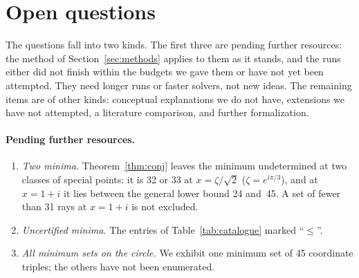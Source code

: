 \section{Open questions}\label{sec:limitations}

The questions fall into two kinds.  The first three are pending further resources: the method of
Section~\ref{sec:methods} applies to them as it stands, and the runs either did not finish
within the budgets we gave them or have not yet been attempted.  They need longer runs or faster
solvers, not new ideas.  The remaining items are of other kinds: conceptual explanations we do
not have, extensions we have not attempted, a literature comparison, and further formalization.

\paragraph{Pending further resources.}
\begin{enumerate}
\item \emph{Two minima.}  Theorem~\ref{thm:conj} leaves the minimum undetermined at two
classes of special points: it is 32 or 33 at $x=\zeta/\sqrt2$ ($\zeta=e^{i\pi/3}$),
and at $x=1+i$ it lies between the general lower bound 24 and~45.  A set of fewer than 31 rays
at $x=1+i$ is not excluded.
\item \emph{Uncertified minima.}  The entries of Table~\ref{tab:catalogue} marked ``$\le$''.
\item \emph{All minimum sets on the circle.}  We exhibit one minimum set of 45 coordinate triples; the others have
not been enumerated.
\end{enumerate}

